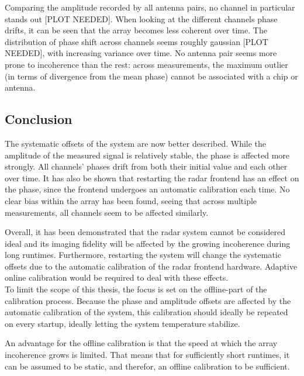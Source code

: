 Comparing the amplitude recorded by all antenna pairs, no channel in particular stands out [PLOT NEEDED].
When looking at the different channels phase drifts, it can be seen that the array becomes less coherent over time.
The distribution of phase shift across channels seems roughly gaussian [PLOT NEEDED], with increasing variance over time.
No antenna pair seems more prone to incoherence than the rest:
across measurements, the maximum outlier (in terms of divergence from the mean phase) cannot be associated with a chip or antenna.

\subsection{Conclusion}
The systematic offsets of the system are now better described.
While the amplitude of the measured signal is relatively stable, the phase is affected more strongly.
All channels' phases drift from both their initial value and each other over time.
It has also be shown that restarting the radar frontend has an effect on the phase, 
since the frontend undergoes an automatic calibration each time.
No clear bias within the array has been found, seeing that across multiple measurements, 
all channels seem to be affected similarly.

Overall, it has been demonstrated that the radar system cannot be considered ideal and
its imaging fidelity will be affected by the growing incoherence during long runtimes.
Furthermore, restarting the system will change the systematic offsets due to the automatic calibration of the radar frontend hardware.
Adaptive online calibration would be required to deal with these effects. \\

To limit the scope of this thesis, the focus is set on the offline-part of the calibration process.
Because the phase and amplitude offsets are affected by the automatic calibration of the system,
this calibration should ideally be repeated on every startup, ideally letting the system temperature stabilize.

An advantage for the offline calibration is that the speed at which the array incoherence grows is limited.
That means that for sufficiently short runtimes, it can be assumed to be static, and therefor, an offline calibration to be sufficient.